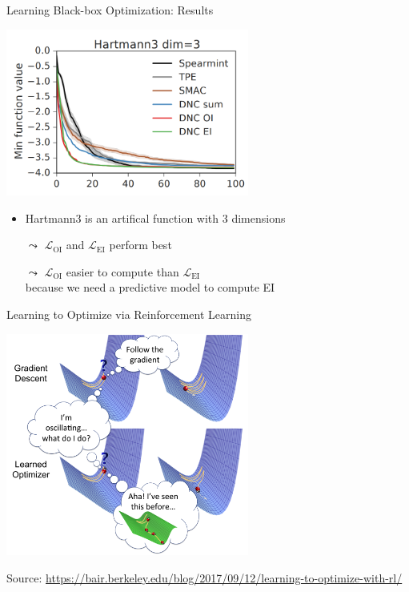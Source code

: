 \begin{frame}[c]{Learning Black-box Optimization: Results\newline {}}

\centering
\includegraphics[width=0.6\textwidth]{images/l2bo_hartmann3}

\begin{itemize}
\item Hartmann3 is an artifical function with 3 dimensions
\pause
\item[$\leadsto$] $\mathcal{L}_{\text{OI}}$ and $\mathcal{L}_{\text{EI}}$ perform best
\item[$\leadsto$] $\mathcal{L}_{\text{OI}}$ easier to compute than $\mathcal{L}_{\text{EI}}$\\ because we need a predictive model to compute EI 
\end{itemize}

\end{frame}
\begin{frame}[c]{Learning to Optimize via Reinforcement Learning\newline {}}

\centering
\includegraphics[width=0.6\textwidth]{images/l2o_comic}

\tiny
Source: \url{https://bair.berkeley.edu/blog/2017/09/12/learning-to-optimize-with-rl/}

\end{frame}
